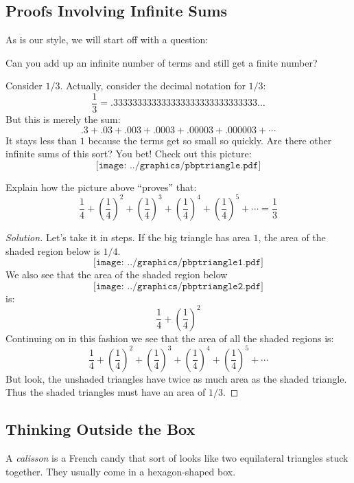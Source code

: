 \subsection{Proofs Involving Infinite Sums}

As is our style, we will start off with a question:

\begin{question} Can you add up an infinite number of terms and still get a 
finite number?
\end{question}


Consider $1/3$.  Actually, consider the decimal notation for $1/3$:
\[
\frac{1}{3} = .333333333333333333333333333333\dots
\]
But this is merely the sum:
\[
.3 + .03 + .003 + .0003 + .00003 + .000003 + \cdots
\]
It stays less than $1$ because the terms get so small so 
quickly.  Are there other infinite sums of this sort?  You 
bet! Check out this picture:
\[
\texttt{[image: ../graphics/pbptriangle.pdf]}
\]
\begin{question} Explain how the picture above ``proves'' that:
\[
\frac{1}{4} + \left(\frac{1}{4}\right)^2 +  \left(\frac{1}{4}\right)^3 +  \left(\frac{1}{4}\right)^4 +  \left(\frac{1}{4}\right)^5 + \cdots = \frac{1}{3}
\]
\end{question}

\begin{proof}[Solution] Let's take it in steps.  If the big triangle has area 
$1$, the area of the shaded region below is $1/4$. 
\[
\texttt{[image: ../graphics/pbptriangle1.pdf]}
\]
We also see that the area of the shaded region below 
\[
\texttt{[image: ../graphics/pbptriangle2.pdf]}
\]
is:
\[
\frac{1}{4} + \left(\frac{1}{4}\right)^2
\]
Continuing on in this fashion we see that the area of all the shaded regions is:
\[
\frac{1}{4} + \left(\frac{1}{4}\right)^2 +  \left(\frac{1}{4}\right)^3 +  \left(\frac{1}{4}\right)^4 +  \left(\frac{1}{4}\right)^5 + \cdots
\]
But look, the unshaded triangles have twice as much area as 
the shaded triangle.  Thus the shaded triangles must have an
area of $1/3$.
\end{proof}



\subsection{Thinking Outside the Box}


A \textit{calisson} is a French candy that sort of looks like two equilateral triangles stuck together. They usually come in a hexagon-shaped box. 


